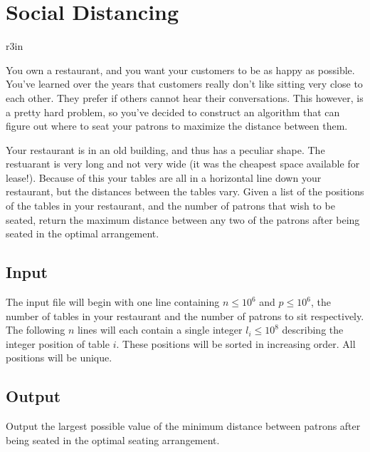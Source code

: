 \documentclass[11pt]{article}
\begin{document}
\section*{Social Distancing}


\begin{wrapfigure}{r}{3in}
\vspace{-10pt}
\vspace{-30pt}
\end{wrapfigure}

You own a restaurant, and you want your customers to be as happy as possible. You've learned over the years that customers really don't like sitting very close to each other. They prefer if others cannot hear their conversations. This however, is a pretty hard problem, so you've decided to construct an algorithm that can figure out where to seat your patrons to maximize the distance between them.

Your restaurant is in an old building, and thus has a peculiar shape. The restuarant is very long and not very wide (it was the cheapest space available for lease!). Because of this your tables are all in a horizontal line down your restaurant, but the distances between the tables vary. Given a list of the positions of the tables in your restaurant, and the number of patrons that wish to be seated, return the maximum distance between any two of the patrons after being seated in the optimal arrangement.

\subsection*{Input}
The input file will begin with one line containing $n \leq 10^6$ and $p \leq 10^6$, the number of tables in your restaurant and the number of patrons to sit respectively. The following $n$ lines will each contain a single integer $l_i \leq 10^8$ describing the integer position of table $i$. These positions will be sorted in increasing order. All positions will be unique.

\subsection*{Output}
Output the largest possible value of the minimum distance between patrons after being seated in the optimal seating arrangement.
\end{document}
